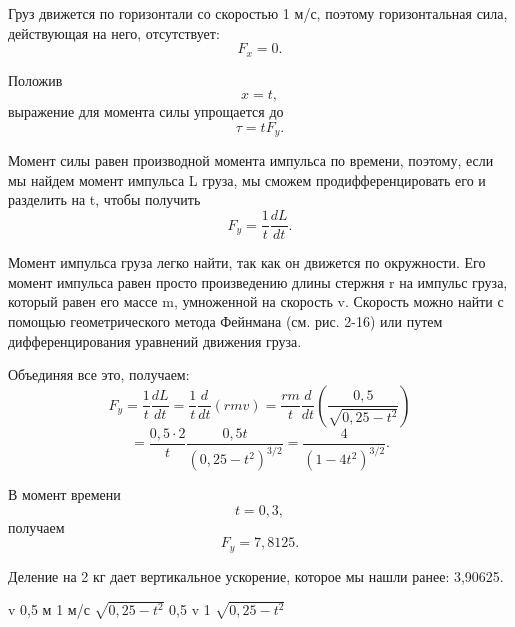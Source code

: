 \documentclass[10pt,oneside]{article}
\newcommand{\TipsRunning}[1]{\par\vspace{2bp}{\centering\footnotesize #1\par}\vspace{2bp}}
\begin{document}
Груз движется по горизонтали со скоростью 1 м/с, поэтому горизонтальная сила, действующая на него, отсутствует: \[F_x = 0.\]\par

Положив \[x = t,\] выражение для момента силы упрощается до \[\tau = t F_y.\]\par

Момент силы равен производной момента импульса по времени, поэтому, если мы найдем момент импульса L груза, мы сможем продифференцировать его и разделить на t, чтобы получить \[F_y = \frac{1}{t} \frac{dL}{dt}.\]\par

Момент импульса груза легко найти, так как он движется по окружности. Его момент импульса равен просто произведению длины стержня r на импульс груза, который равен его массе m, умноженной на скорость v. Скорость можно найти с помощью геометрического метода Фейнмана (см. рис. 2-16) или путем дифференцирования уравнений движения груза.\par

Объединяя все это, получаем: \[F_y = \frac{1}{t} \frac{dL}{dt} = \frac{1}{t} \frac{d}{dt}(rmv) = \frac{rm}{t} \frac{d}{dt}\left(\frac{0,5}{\sqrt{0,25 - t^2}}\right)\] \[= \frac{0,5 \cdot 2}{t} \frac{0,5 t}{(0,25 - t^2)^{3/2}} = \frac{4}{(1 - 4t^2)^{3/2}}.\]\par

В момент времени \[t = 0,3,\] получаем \[F_y = 7,8125.\]\par

Деление на 2 кг дает вертикальное ускорение, которое мы нашли ранее: 3,90625.\par

v 0,5 м 1 м/с \(\sqrt{0,25 - t^2}\) 0,5 v 1 \(\sqrt{0,25 - t^2}\)\par

\TipsRunning{Р И С У Н О К  2 - 1 6}

\clearpage
{}
\end{document}
